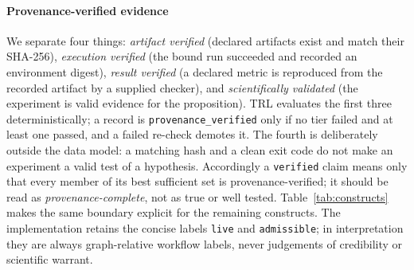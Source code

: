 \documentclass[cmc,article,submit,moreauthors,pdftex]{Definitions/tsp}
\begin{document}
\paragraph{Provenance-verified evidence}
We separate four things: \emph{artifact verified} (declared artifacts exist and match their SHA-256), \emph{execution verified} (the bound run succeeded and recorded an environment digest), \emph{result verified} (a declared metric is reproduced from the recorded artifact by a supplied checker), and \emph{scientifically validated} (the experiment is valid evidence for the proposition). TRL evaluates the first three deterministically; a record is \texttt{provenance\_verified} only if no tier failed and at least one passed, and a failed re-check demotes it. The fourth is deliberately outside the data model: a matching hash and a clean exit code do not make an experiment a valid test of a hypothesis. Accordingly a \texttt{verified} claim means only that every member of its best sufficient set is provenance-verified; it should be read as \emph{provenance-complete}, not as true or well tested. Table~\ref{tab:constructs} makes the same boundary explicit for the remaining constructs. The implementation retains the concise labels \texttt{live} and \texttt{admissible}; in interpretation they are always graph-relative workflow labels, never judgements of credibility or scientific warrant.
\end{document}
